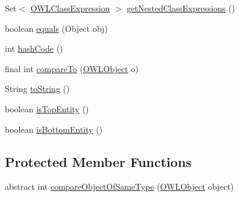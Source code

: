 \begin{DoxyCompactItemize}
\item 
Set$<$ \hyperlink{interfaceorg_1_1semanticweb_1_1owlapi_1_1model_1_1_o_w_l_class_expression}{O\-W\-L\-Class\-Expression} $>$ \hyperlink{classuk_1_1ac_1_1manchester_1_1cs_1_1owl_1_1owlapi_1_1_o_w_l_object_impl_a9cba687657bb45d601dcbb24efbc0a06}{get\-Nested\-Class\-Expressions} ()
\item 
boolean \hyperlink{classuk_1_1ac_1_1manchester_1_1cs_1_1owl_1_1owlapi_1_1_o_w_l_object_impl_a008d38cc12efd679c0b00cfe35a58299}{equals} (Object obj)
\item 
int \hyperlink{classuk_1_1ac_1_1manchester_1_1cs_1_1owl_1_1owlapi_1_1_o_w_l_object_impl_aeec58d7a4cd2c2d8e141f6441c1332dc}{hash\-Code} ()
\item 
final int \hyperlink{classuk_1_1ac_1_1manchester_1_1cs_1_1owl_1_1owlapi_1_1_o_w_l_object_impl_a2e2beadf5a65379e393d1e5f4876d715}{compare\-To} (\hyperlink{interfaceorg_1_1semanticweb_1_1owlapi_1_1model_1_1_o_w_l_object}{O\-W\-L\-Object} o)
\item 
String \hyperlink{classuk_1_1ac_1_1manchester_1_1cs_1_1owl_1_1owlapi_1_1_o_w_l_object_impl_a130f1c36a06d5f934d746282f95d1a1e}{to\-String} ()
\item 
boolean \hyperlink{classuk_1_1ac_1_1manchester_1_1cs_1_1owl_1_1owlapi_1_1_o_w_l_object_impl_a5a36e4ff1e72e64295cbc4ae2632f043}{is\-Top\-Entity} ()
\item 
boolean \hyperlink{classuk_1_1ac_1_1manchester_1_1cs_1_1owl_1_1owlapi_1_1_o_w_l_object_impl_af70e6fd4799bcfe552204a6a0f7a80f7}{is\-Bottom\-Entity} ()
\end{DoxyCompactItemize}
\subsection*{Protected Member Functions}
\begin{DoxyCompactItemize}
\item 
abstract int \hyperlink{classuk_1_1ac_1_1manchester_1_1cs_1_1owl_1_1owlapi_1_1_o_w_l_object_impl_aed94406b56e0bfe19df00a66c05e4b7e}{compare\-Object\-Of\-Same\-Type} (\hyperlink{interfaceorg_1_1semanticweb_1_1owlapi_1_1model_1_1_o_w_l_object}{O\-W\-L\-Object} object)
\end{DoxyCompactItemize}
